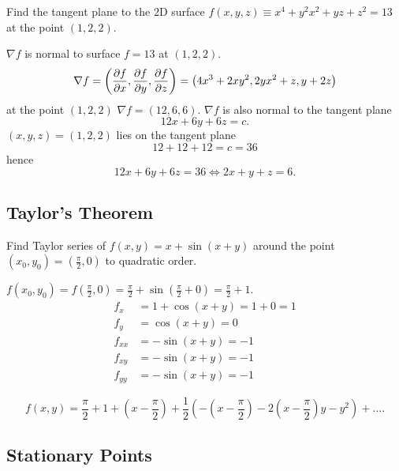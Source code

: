\documentclass[10pt, a4paper]{article}
\begin{document}
\begin{example}
    Find the tangent plane to the $2$D surface $f(x, y, z) \equiv x ^ 4 + y ^ 2x ^ 2 + yz + z ^ 2 = 13$ at the point $(1, 2, 2)$.
    \begin{solution}
        $\nabla f$ is normal to surface $f = 13$ at $(1, 2, 2)$.
        \[
        \nabla f = \left(\pd[f]{x}, \pd[f]{y}, \pd[f]{z}\right) = \left(4x ^ 3 + 2xy ^ 2, 2yx ^ 2 + z, y + 2z\right)
        \]
        at the point $(1, 2, 2)$ $\nabla f = (12, 6, 6)$.
        $\nabla f$ is also normal to the tangent plane
        \[
        12x + 6y + 6z = c.
        \]
        $(x, y, z) = (1, 2, 2)$ lies on the tangent plane
        \[
        12 + 12 + 12 = c = 36
        \]
        hence
        \[
        12x + 6y + 6z = 36 \iff 2x + y + z = 6.
        \]
    \end{solution}
\end{example}

\subsection{Taylor's Theorem}

\begin{example}
    Find Taylor series of $f(x, y) = x + \sin(x + y)$ around the point $(x_0, y_0) = \left(\frac{\pi}{2}, 0\right)$ to quadratic order.

    \begin{solution}
        $f(x_0, y_0) = f\left(\frac{\pi}{2}, 0\right) = \frac{\pi}{2} + \sin\left(\frac{\pi}{2} + 0\right) = \frac{\pi}{2} + 1$.
        \begin{align*}
            f_x &= 1 + \cos(x + y) = 1 + 0 = 1 \\
            f_y &= \cos(x + y) = 0 \\
            f_{xx} &= -\sin(x + y) = -1 \\
            f_{xy} &= -\sin(x + y) = -1 \\
            f_{yy} &= -\sin(x + y) = -1
        \end{align*}

        \[
        f(x, y) = \frac{\pi}{2} + 1 + \left(x - \frac{\pi}{2}\right) + \frac{1}{2}\left(-\left(x - \frac{\pi}{2}\right) - 2\left(x - \frac{\pi}{2}\right)y - y ^ 2\right) + \dotsc.
        \]
    \end{solution}
\end{example}

\subsection{Stationary Points}
\end{document}
